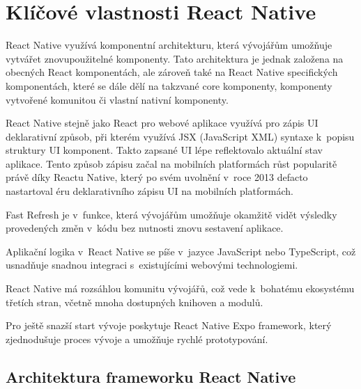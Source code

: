 \section*{Klíčové vlastnosti React Native}

React Native využívá komponentní architekturu, která vývojářům umožňuje 
vytvářet znovupoužitelné komponenty. \cite{reactNativeComponents} Tato architektura je jednak založena na obecných
React komponentách, ale zároveň také na React Native specifických komponentách, které se dále dělí na takzvané core
komponenty, komponenty vytvořené komunitou či vlastní nativní komponenty. \cite{reactNativeComponents}

    
React Native stejně jako React pro webové aplikace využívá pro zápis UI deklarativní způsob, 
při kterém využívá JSX (JavaScript XML) syntaxe k~popisu struktury UI komponent. \cite{reactNativeJSX}
Takto zapsané UI lépe reflektovalo aktuální stav aplikace.
Tento způsob zápisu začal na mobilních platformách růst popularitě právě díky Reactu Native, který po svém uvolnění v~roce 2013 
defacto nastartoval éru deklarativního zápisu UI na mobilních platformách. \cite{declarativeUIHistory}

Fast Refresh je v~funkce, která vývojářům umožňuje okamžitě vidět výsledky provedených 
změn v~kódu bez nutnosti znovu sestavení aplikace. \cite{reactNativeFastRefresh}

Aplikační logika v~React Native se píše v~jazyce JavaScript nebo TypeScript, 
což usnadňuje snadnou integraci s~existujícími webovými technologiemi. \cite{reactNativeFundamentals}

React Native má rozsáhlou komunitu vývojářů, což vede k~bohatému ekosystému 
třetích stran, včetně mnoha dostupných knihoven a modulů. \cite{reactNativeComunity}

Pro ještě snazší start vývoje poskytuje React Native Expo framework, který 
zjednodušuje proces vývoje a umožňuje rychlé prototypování. \cite{reactNativeExpo}

\subsection*{Architektura frameworku React Native}

